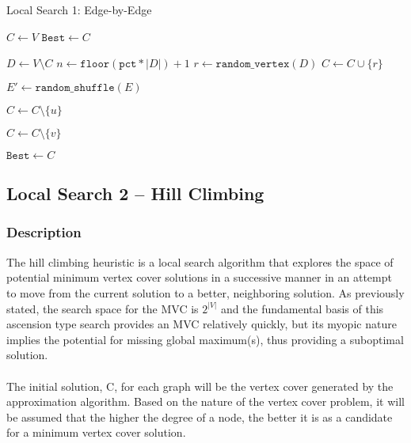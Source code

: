 \documentclass{sig-alternate-05-2015}
\begin{document}
\begin{algorithm}
\LinesNumbered
\DontPrintSemicolon
\BlankLine
 

\caption{Local Search 1: Edge-by-Edge}

\BlankLine
\Begin
{
	$C \leftarrow V$\;
	$\texttt{Best} \leftarrow C$\;
    {
    		{
        		$D \leftarrow V \setminus C$\;
        		$n \leftarrow \texttt{floor}(\texttt{pct} * |D|)+1$\;
        		{
        			$r \leftarrow \texttt{random\_vertex}(D)$\;
        			$C \leftarrow C \cup \lbrace r \rbrace$\;
        		}
        		
        }
        $ E' \leftarrow \texttt{random\_shuffle}(E)$\;
        {
        		{
        			{
        				{
        					$C \leftarrow C \setminus \lbrace u \rbrace$\;
        				}
				}
			
				{
					{
						$C \leftarrow C \setminus \lbrace v \rbrace$\;
					}
				}
				
        			
        		}
        }
        {
        		$\texttt{Best} \leftarrow C$\;
        }
    }
}

\end{algorithm}

 
\subsection{Local Search 2 -- Hill Climbing}
\subsubsection{Description}
The hill climbing heuristic is a local search algorithm that explores the space of potential minimum vertex cover solutions in a successive manner in an attempt to move from the current solution to a better, neighboring solution.  As previously stated, the search space for the MVC is $2^{|V|}$ and the fundamental basis of this ascension type search provides an MVC relatively quickly, but its myopic nature implies the potential for missing global maximum(s), thus providing a suboptimal solution.
\\
\\
The initial solution, C, for each graph will be the vertex cover generated by the approximation algorithm. Based on the nature of the vertex cover problem, it will be assumed that the higher the degree of a node, the better it is as a candidate for a minimum vertex cover solution.
\end{document}
